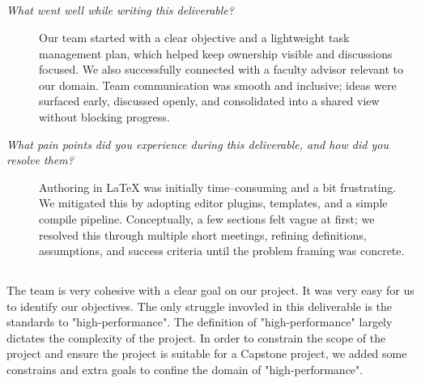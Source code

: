 \documentclass{article}
\begin{document}
\subsection*{\color{blue}{Xiaotian Lou}}
\begin{description}
  \item[\textit{What went well while writing this deliverable?}]
        Our team started with a clear objective and a lightweight task
        management plan, which helped keep ownership visible and discussions
        focused. We also successfully connected with a faculty advisor relevant
        to our domain. Team communication was smooth and inclusive; ideas were
        surfaced early, discussed openly, and consolidated into a shared view
        without blocking progress.

  \item[\textit{What pain points did you experience during this deliverable, and how did you resolve them?}]
        Authoring in \LaTeX{} was initially time--consuming and a bit
        frustrating. We mitigated this by adopting editor plugins, templates,
        and a simple compile pipeline. Conceptually, a few sections felt vague
        at first; we resolved this through multiple short meetings, refining
        definitions, assumptions, and success criteria until the problem
        framing was concrete.

\end{description}

\subsection{\color{blue}{Shike Chen}}

The team is very cohesive with a clear goal on our project. It was very easy
for us to identify our objectives. The only struggle invovled in this
deliverable is the standards to "high-performance". The definition of
"high-performance" largely dictates the complexity of the project. In order to
constrain the scope of the project and ensure the project is suitable for a
Capstone project, we added some constrains and extra goals to confine the
domain of "high-performance".



\end{document}
